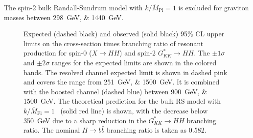 The spin-2 bulk Randall-Sundrum model with $k/\overline{M}_{\mathrm{Pl}} = 1$ is excluded for 
graviton masses between \SIlist{298;1440}{\GeV}.
\begin{figure}[ht]
  \centering
  \vspace*{-3cm}

  \caption{\label{fig:res-limits}
    Expected (dashed black) and observed (solid black) 95\% CL upper limits on the cross-section times branching ratio of resonant production for spin-0 (\(X \rightarrow HH\)) and spin-2 \(G_{KK}^{*} \rightarrow HH\). 
    The \(\pm 1\sigma\) and \(\pm 2\sigma\) ranges for the expected limits are shown in the colored bands. 
    The resolved channel expected limit is shown in dashed pink and covers the range from \SIlist{251;1500}{\GeV}. 
    It is combined with the boosted channel (dashed blue) between \SIlist{900;1500}{\GeV}.
    The theoretical prediction for the bulk RS model with \(k/\overline{M}_{\mathrm{Pl}} = 1\)~\cite{Carvalho} 
    (solid red line) is shown, with the decrease below \SI{350}{\GeV} due to a sharp reduction in the \(G_{KK}^{*} \rightarrow HH\) branching ratio. The nominal \(H \rightarrow b\bar{b}\) branching ratio is taken as 0.582.
  }
\end{figure}

